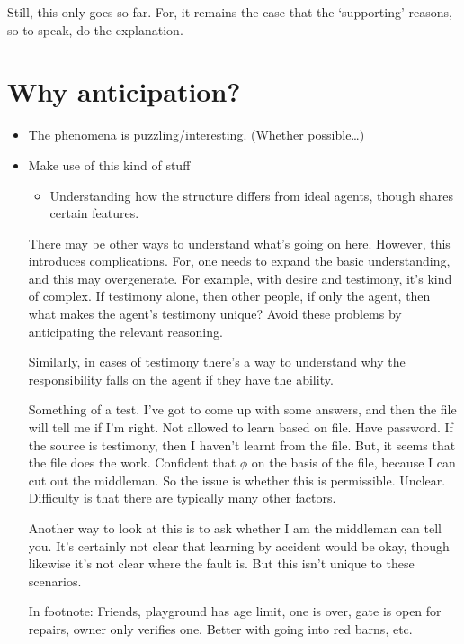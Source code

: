 \documentclass[10pt]{article}
\begin{document}
Still, this only goes so far.
For, it remains the case that the `supporting' reasons, so to speak, do the explanation.


\section{Why anticipation?}
\label{sec:why-anticipation}

\begin{itemize}
\item The phenomena is puzzling/interesting. (Whether possible\dots)
\item Make use of this kind of stuff
  \begin{itemize}
  \item Understanding how the structure differs from ideal agents, though shares certain features.
  \end{itemize}
  There may be other ways to understand what's going on here.
  However, this introduces complications.
  For, one needs to expand the basic understanding, and this may overgenerate.
  For example, with desire and testimony, it's kind of complex.
  If testimony alone, then other people, if only the agent, then what makes the agent's testimony unique?
  Avoid these problems by anticipating the relevant reasoning.

  Similarly, in cases of testimony there's a way to understand why the responsibility falls on the agent if they have the ability.
  \begin{scenario}
    Something of a test.
    I've got to come up with some answers, and then the file will tell me if I'm right.
    Not allowed to learn based on file.
    Have password.
    If the source is testimony, then I haven't learnt from the file.
    But, it seems that the file does the work.
    Confident that \(\phi\) on the basis of the file, because I can cut out the middleman.
    So the issue is whether this is permissible.
    Unclear.
    Difficulty is that there are typically many other factors.

    Another way to look at this is to ask whether I am the middleman can tell you.
    It's certainly not clear that learning by accident would be okay, though likewise it's not clear where the fault is.
    But this isn't unique to these scenarios.

    In footnote:
    Friends, playground has age limit, one is over, gate is open for repairs, owner only verifies one.
    Better with going into red barns, etc.
  \end{scenario}
\end{itemize}
\end{document}
